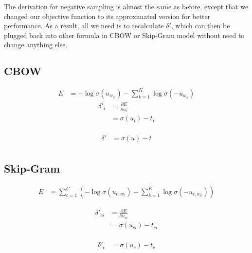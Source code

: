 \documentclass{article}
\begin{document}
The derivation for negative sampling is almost the same as before, except that we changed our objective function to its  approximated version for better performance. As a result, all we need is to recalculate $\delta'$, which can then be plugged back into other formula in CBOW or Skip-Gram model without need to change anything else. 
	\subsection {CBOW} 
	\begin{equation}
		\begin{aligned}
			E &= -\log \sigma(u_{w_O}) - \sum_{k=1}^{K} \log \sigma (-u_{w_k}) 
		\end{aligned}
	\end{equation}
	\begin{equation}
		\begin{aligned}
			\delta'_{i} &= \frac{\partial E}{\partial u_{i}} \\
			&= \sigma(u_{i}) - t_{i} \\
		\end{aligned}
	\end{equation}
		
	\begin{equation}
		\begin{aligned}
			\delta' &= \sigma(u) - t \\
		\end{aligned}	
	\end{equation}
	
	\subsection {Skip-Gram} 
	\begin{equation}
		\begin{aligned}
		E &= \sum_{c=1}^{C} \left( -\log \sigma(u_{c,w_c}) - \sum_{k=1}^{K} \log \sigma (-u_{c,w_k})  \right)
		\end{aligned}
	\end{equation}
	
	\begin{equation}
		\begin{aligned}
			\delta'_{ci} &= \frac{\partial E}{\partial u_{ci}} \\
			&= \sigma(u_{ci}) - t_{ci} \\
		\end{aligned}
	\end{equation}
		
	\begin{equation}
		\begin{aligned}
			\delta'_{c} &= \sigma(u_{c}) - t_{c} \\
		\end{aligned}
	\end{equation}
\end{document}
